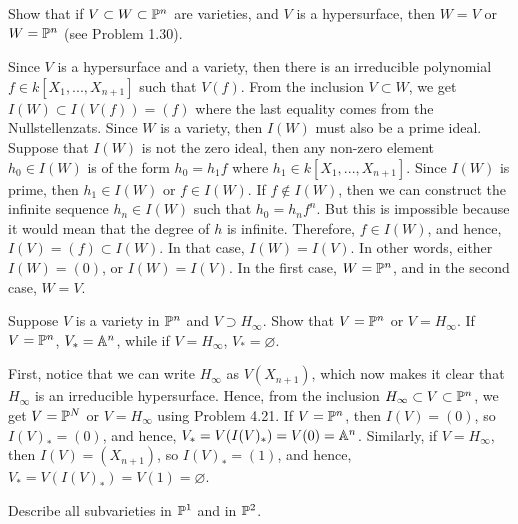 \begin{exercise}
    Show that if $V \subset W \subset \P^n$ are varieties, and $V$ is a hypersurface, then $W = V$ or $W = \P^n$ (see Problem 1.30). \\
\end{exercise}

\begin{solution}
    Since $V$ is a hypersurface and a variety, then there is an irreducible polynomial $f \in k[X_1, ..., X_{n+1}]$ such that $V(f)$. From the inclusion $V \subset W$, we get $I(W) \subset I(V(f)) = (f)$ where the last equality comes from the Nullstellenzats. Since $W$ is a variety, then $I(W)$ must also be a prime ideal. Suppose that $I(W)$ is not the zero ideal, then any non-zero element $h_0 \in I(W)$ is of the form $h_0 = h_1f$ where $h_1 \in k[X_1, ..., X_{n+1}]$. Since $I(W)$ is prime, then $h_1 \in I(W)$ or $f \in I(W)$. If $f \notin I(W)$, then we can construct the infinite sequence $h_n \in I(W)$ such that $h_0 = h_n f^n$. But this is impossible because it would mean that the degree of $h$ is infinite. Therefore, $f \in I(W)$, and hence, $I(V) = (f) \subset I(W)$. In that case, $I(W) = I(V)$. In other words, either $I(W) = (0)$, or $I(W) = I(V)$. In the first case, $W = \P^n$, and in the second case, $W = V$. \\
\end{solution}

\begin{exercise}
    Suppose $V$ is a variety in $\P^n$ and $V \supset H_{\infty}$. Show that $V = \P^n$ or $V = H_{\infty}$. If $V = \P^n$, $V_* = \A^n$, while if $V = H_{\infty}$, $V_* = \varnothing$. \\
\end{exercise}

\begin{solution}
    First, notice that we can write $H_{\infty}$ as $V(X_{n+1})$, which now makes it clear that $H_{\infty}$ is an irreducible hypersurface. Hence, from the inclusion $H_{\infty} \subset V \subset \P^n$, we get $V = \P^N$ or $V = H_{\infty}$ using Problem 4.21. If $V = \P^n$, then $I(V) = (0)$, so $I(V)_* = (0)$, and hence, $V_* = V(I(V)_*) = V(0) = \A^n$. Similarly, if $V = H_{\infty}$, then $I(V) = (X_{n+1})$, so $I(V)_* = (1)$, and hence, $V_* = V(I(V)_*) = V(1) = \varnothing$. \\
\end{solution}

\begin{exercise}
    Describe all subvarieties in $\P^1$ and in $\P^2$. \\
\end{exercise}

